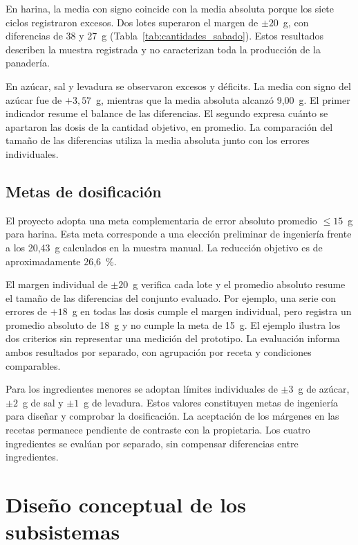 En harina, la media con signo coincide con la media absoluta porque los
siete ciclos registraron excesos. Dos lotes superaron el margen de
$\pm20$~g, con diferencias de 38 y 27~g
(Tabla~\ref{tab:cantidades_sabado}). Estos resultados describen la
muestra registrada y no caracterizan toda la producción de la panadería.

En azúcar, sal y levadura se observaron excesos y déficits. La media
con signo del azúcar fue de $+3{,}57$~g, mientras que la media absoluta
alcanzó 9,00~g. El primer indicador resume el balance de las diferencias.
El segundo expresa cuánto se apartaron las dosis de la cantidad objetivo,
en promedio. La comparación del tamaño de las diferencias utiliza la
media absoluta junto con los errores individuales.

\subsection{Metas de dosificación}

El proyecto adopta una meta complementaria de error absoluto promedio
$\leq15$~g para harina. Esta meta corresponde a una elección preliminar
de ingeniería frente a los 20,43~g calculados en la muestra manual.
La reducción objetivo es de aproximadamente 26,6~\%.

El margen individual de $\pm20$~g verifica cada lote y el promedio
absoluto resume el tamaño de las diferencias del conjunto evaluado.
Por ejemplo, una serie con errores de $+18$~g en todas las dosis
cumple el margen individual, pero registra un promedio absoluto de
18~g y no cumple la meta de 15~g. El ejemplo ilustra los dos criterios
sin representar una medición del prototipo. La evaluación informa ambos
resultados por separado, con agrupación por receta y condiciones comparables.

Para los ingredientes menores se adoptan límites individuales de
$\pm3$~g de azúcar, $\pm2$~g de sal y $\pm1$~g de levadura.
Estos valores constituyen metas de ingeniería para diseñar y comprobar
la dosificación. La aceptación de los márgenes en las recetas permanece
pendiente de contraste con la propietaria. Los cuatro ingredientes
se evalúan por separado, sin compensar diferencias entre ingredientes.


\section{Diseño conceptual de los subsistemas}
\label{sec:diseno_conceptual}

